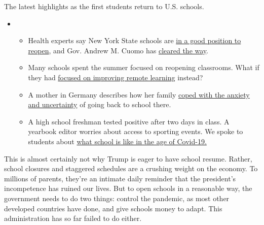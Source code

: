 The latest highlights as the first students return to U.S. schools.

\begin{itemize}
\item
  \begin{itemize}
  \tightlist
  \item
    Health experts say New York State schools are
    \href{https://www.nytimes.com/2020/08/07/health/coronavirus-ny-schools-reopen.html?action=click\&pgtype=Article\&state=default\&region=MAIN_CONTENT_2\&context=storylines_keepup}{in
    a good position to reopen}, and Gov. Andrew M. Cuomo has
    \href{https://www.nytimes.com/2020/08/07/nyregion/cuomo-schools-reopening.html?action=click\&pgtype=Article\&state=default\&region=MAIN_CONTENT_2\&context=storylines_keepup}{cleared
    the way}.
  \item
    Many schools spent the summer focused on reopening classrooms. What
    if they had
    \href{https://www.nytimes.com/2020/08/07/us/remote-learning-fall-2020.html?action=click\&pgtype=Article\&state=default\&region=MAIN_CONTENT_2\&context=storylines_keepup}{focused
    on improving remote learning} instead?
  \item
    A mother in Germany describes how her family
    \href{https://www.nytimes.com/2020/08/07/parenting/germany-schools-reopening-children.html?action=click\&pgtype=Article\&state=default\&region=MAIN_CONTENT_2\&context=storylines_keepup}{coped
    with the anxiety and uncertainty} of going back to school there.
  \item
    A high school freshman tested positive after two days in class. A
    yearbook editor worries about access to sporting events. We spoke to
    students about
    \href{https://www.nytimes.com/2020/08/06/us/coronavirus-students.html?action=click\&pgtype=Article\&state=default\&region=MAIN_CONTENT_2\&context=storylines_keepup}{what
    school is like in the age of Covid-19.}
  \end{itemize}
\end{itemize}

This is almost certainly not why Trump is eager to have school resume.
Rather, school closures and staggered schedules are a crushing weight on
the economy. To millions of parents, they're an intimate daily reminder
that the president's incompetence has ruined our lives. But to open
schools in a reasonable way, the government needs to do two things:
control the pandemic, as most other developed countries have done, and
give schools money to adapt. This administration has so far failed to do
either.

